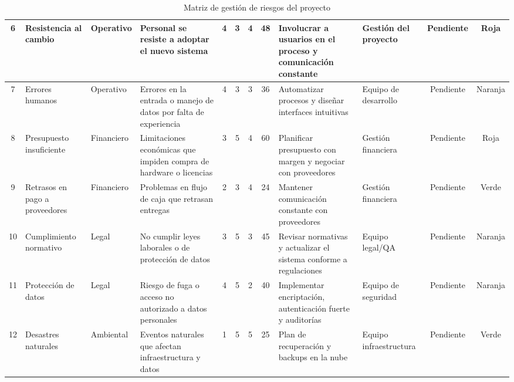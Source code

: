 \begin{table}[h!]
{\begin{tabular}{|c|l|l|p{3cm}|c|c|c|c|p{4cm}|l|c|c|}
			6  & Resistencia al cambio              & Operativo  & Personal se resiste a adoptar el nuevo sistema                                                   & 4 & 3 & 4 & 48 & Involucrar a usuarios en el proceso y comunicación constante         & Gestión del proyecto      & Pendiente & Roja    \\ \hline
			7  & Errores humanos                    & Operativo  & Errores en la entrada o manejo de datos por falta de experiencia                                 & 4 & 3 & 3 & 36 & Automatizar procesos y diseñar interfaces intuitivas                 & Equipo de desarrollo      & Pendiente & Naranja \\ \hline
			8  & Presupuesto insuficiente           & Financiero & Limitaciones económicas que impiden compra de hardware o licencias                               & 3 & 5 & 4 & 60 & Planificar presupuesto con margen y negociar con proveedores         & Gestión financiera        & Pendiente & Roja    \\ \hline
			9  & Retrasos en pago a proveedores     & Financiero & Problemas en flujo de caja que retrasan entregas                                                 & 2 & 3 & 4 & 24 & Mantener comunicación constante con proveedores                      & Gestión financiera        & Pendiente & Verde   \\ \hline
			10 & Cumplimiento normativo             & Legal      & No cumplir leyes laborales o de protección de datos                                              & 3 & 5 & 3 & 45 & Revisar normativas y actualizar el sistema conforme a regulaciones   & Equipo legal/QA           & Pendiente & Naranja \\ \hline
			11 & Protección de datos                & Legal      & Riesgo de fuga o acceso no autorizado a datos personales                                         & 4 & 5 & 2 & 40 & Implementar encriptación, autenticación fuerte y auditorías          & Equipo de seguridad       & Pendiente & Naranja \\ \hline
			12 & Desastres naturales                & Ambiental  & Eventos naturales que afectan infraestructura y datos                                            & 1 & 5 & 5 & 25 & Plan de recuperación y backups en la nube                            & Equipo infraestructura    & Pendiente & Verde   \\ \hline
		\end{tabular}
	}
	\caption{Matriz de gestión de riesgos del proyecto}
	\label{tab:gestion_riesgos}
\end{table}

